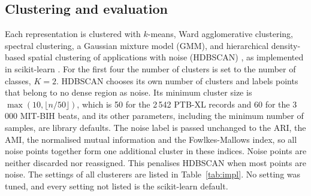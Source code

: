 \documentclass[preprint,11pt]{elsarticle}
\begin{document}
\subsection{Clustering and evaluation}\label{sec:clust}

Each representation is clustered with $k$-means, Ward agglomerative clustering, spectral
clustering, a Gaussian mixture model (GMM), and hierarchical density-based spatial
clustering of applications with noise (HDBSCAN) \cite{hdbscan2013}, as implemented in
scikit-learn \cite{sklearn2011}. For the first four the number of clusters is set to the
number of classes, $K=2$. HDBSCAN chooses its own number of clusters and labels points
that belong to no dense region as noise. Its minimum cluster size is
$\max(10, \lfloor n/50 \rfloor)$, which is 50 for the 2\,542 PTB-XL records and 60 for
the 3\,000 MIT-BIH beats, and its other parameters, including the minimum number of
samples, are library defaults. The noise label is passed unchanged to the ARI, the AMI,
the normalised mutual information and the Fowlkes-Mallows index, so all noise points
together form one additional cluster in these indices. Noise points are neither
discarded nor reassigned. This penalises HDBSCAN when most points are noise. The settings
of all clusterers are listed in Table~\ref{tab:impl}. No setting was tuned, and every
setting not listed is the scikit-learn default.
\end{document}
